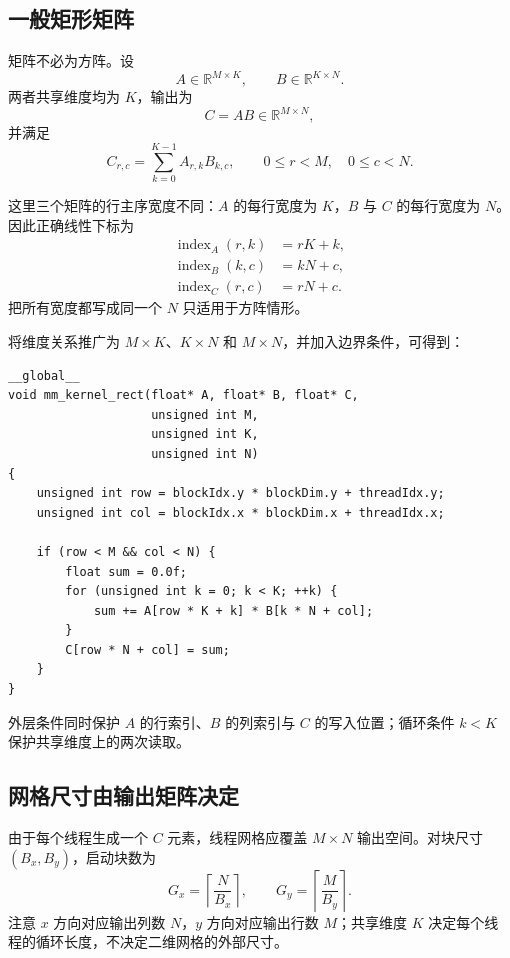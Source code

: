 \subsection{一般矩形矩阵}

矩阵不必为方阵。设
\[
A\in\mathbb{R}^{M\times K},\qquad
B\in\mathbb{R}^{K\times N}.
\]
两者共享维度均为 $K$，输出为
\[
C=AB\in\mathbb{R}^{M\times N},
\]
并满足
\[
\boxed{
C_{r,c}=\sum_{k=0}^{K-1}A_{r,k}B_{k,c}},
\qquad
0\leq r<M,
\quad
0\leq c<N.
\]

这里三个矩阵的行主序宽度不同：$A$ 的每行宽度为 $K$，$B$ 与 $C$ 的每行宽度为 $N$。因此正确线性下标为
\[
\begin{aligned}
\operatorname{index}_A(r,k)&=rK+k,\\
\operatorname{index}_B(k,c)&=kN+c,\\
\operatorname{index}_C(r,c)&=rN+c.
\end{aligned}
\]
把所有宽度都写成同一个 $N$ 只适用于方阵情形。

\begin{derivationbox}[title=带边界条件的矩形版本]
将维度关系推广为 $M\times K$、$K\times N$ 和 $M\times N$，并加入边界条件，可得到：
\par\noindent\begin{minipage}{\linewidth}
\begin{lstlisting}
__global__
void mm_kernel_rect(float* A, float* B, float* C,
                    unsigned int M,
                    unsigned int K,
                    unsigned int N)
{
    unsigned int row = blockIdx.y * blockDim.y + threadIdx.y;
    unsigned int col = blockIdx.x * blockDim.x + threadIdx.x;

    if (row < M && col < N) {
        float sum = 0.0f;
        for (unsigned int k = 0; k < K; ++k) {
            sum += A[row * K + k] * B[k * N + col];
        }
        C[row * N + col] = sum;
    }
}
\end{lstlisting}
\end{minipage}\par
外层条件同时保护 $A$ 的行索引、$B$ 的列索引与 $C$ 的写入位置；循环条件 $k<K$ 保护共享维度上的两次读取。
\end{derivationbox}

\subsection{网格尺寸由输出矩阵决定}

由于每个线程生成一个 $C$ 元素，线程网格应覆盖 $M\times N$ 输出空间。对块尺寸 $(B_x,B_y)$，启动块数为
\[
G_x=\left\lceil\frac{N}{B_x}\right\rceil,
\qquad
G_y=\left\lceil\frac{M}{B_y}\right\rceil.
\]
注意 $x$ 方向对应输出列数 $N$，$y$ 方向对应输出行数 $M$；共享维度 $K$ 决定每个线程的循环长度，不决定二维网格的外部尺寸。

